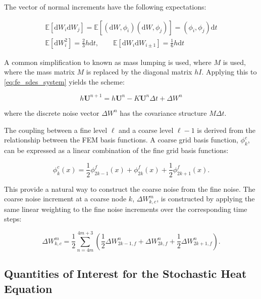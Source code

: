 The vector of normal increments have the following expectations:

\begin{align*}
    \mathbb{E}[\mathrm{d}W_i \mathrm{d}W_j] = \mathbb{E}[(\mathrm{d}W, \phi_i) 
    (\mathrm{d}W, \phi_j)] = (\phi_i, \phi_j)\mathrm{d}t\\
    \mathbb{E}[\mathrm{d}W_i^2] = \frac{2}{3}h \mathrm{d}t, \qquad 
    \mathbb{E}[\mathrm{d}W_i \mathrm{d}W_{i\pm 1}] = \frac{1}{6} h \mathrm{d}t
\end{align*}

A common simplification to known as mass lumping is used, where $M$
is used, where the mass matrix $M$ is replaced by the diagonal matrix $hI$. 
Applying this to \eqref{eq:fe_sdes_system} yields the scheme:

\begin{equation*}
    h\mathbf{U}^{n+1} = h\mathbf{U}^n - K \mathbf{U}^n \Delta t + \Delta W^n
\end{equation*}

where the discrete noise vector $\Delta W^n$ has the covariance structure 
$M \Delta t$.

The coupling between a fine level $\ell$ and a coarse level $\ell-1$ is derived 
from the relationship between the FEM basis functions. A coarse grid basis 
function, $\phi_k^c$, can be expressed as a linear combination of the fine grid basis functions:

\begin{equation*}
    \phi_k^c(x) = \frac{1}{2} \phi_{2k-1}^f(x) + \phi_{2k}^f(x) + \frac{1}{2}\phi_{2k+1}^f(x).
\end{equation*}

This provide a natural way to construct the coarse noise from the fine noise. The coarse
noise increment at a coarse node $k$, $\Delta W_{k,c}^m$, is constructed by applying the same 
linear weighting to the fine noise increments over the corresponding time steps: 

\begin{equation}\label{eq:fe_coupling_eqn}
    \Delta W_{k,c}^m = \frac{1}{2} \sum_{n=4m}^{4m+3} \left( 
        \frac{1}{2}\Delta W_{2k-1,f}^n + \Delta W_{2k,f}^n + 
        \frac{1}{2}\Delta W_{2k+1,f}^n \right).
\end{equation}


\subsection{Quantities of Interest for the Stochastic Heat Equation}\label{sec:QoI_for_SHE}

